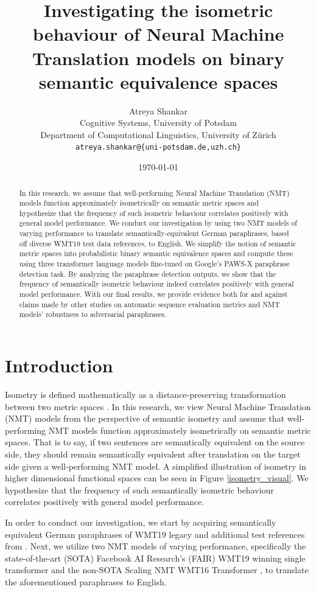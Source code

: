 \documentclass[11pt,a4paper]{article}
\title{Investigating the isometric behaviour of Neural Machine Translation models on binary semantic equivalence spaces}
\author{Atreya Shankar \\
  Cognitive Systems, University of Potsdam \\
  Department of Computational Linguistics, University of Zürich \\
  \texttt{atreya.shankar@\{uni-potsdam.de,uzh.ch\}}}
\date{\today}
\begin{document}
\maketitle

\begin{abstract}
In this research, we assume that well-performing Neural Machine Translation (NMT) models function approximately isometrically on semantic metric spaces and hypothesize that the frequency of such isometric behaviour correlates positively with general model performance. We conduct our investigation by using two NMT models of varying performance to translate semantically-equivalent German paraphrases, based off diverse WMT19 test data references, to English. We simplify the notion of semantic metric spaces into probabilistic binary semantic equivalence spaces and compute these using three transformer language models fine-tuned on Google's PAWS-X paraphrase detection task. By analyzing the paraphrase detection outputs, we show that the frequency of semantically isometric behaviour indeed correlates positively with general model performance. With our final results, we provide evidence both for and against claims made by other studies on automatic sequence evaluation metrics and NMT models' robustness to adversarial paraphrases.
\end{abstract}

\section{Introduction}

Isometry is defined mathematically as a distance-preserving transformation between two metric spaces \cite{coxeter1961introduction}. In this research, we view Neural Machine Translation (NMT) models from the perspective of semantic isometry and assume that well-performing NMT models function approximately isometrically on semantic metric spaces. That is to say, if two sentences are semantically equivalent on the source side, they should remain semantically equivalent after translation on the target side given a well-performing NMT model. A simplified illustration of isometry in higher dimensional functional spaces can be seen in Figure \ref{isometry_visual}. We hypothesize that the frequency of such semantically isometric behaviour correlates positively with general model performance. 

In order to conduct our investigation, we start by acquiring semantically equivalent German paraphrases of WMT19 legacy and additional test references from \citet{freitag-bleu-paraphrase-references-2020}. Next, we utilize two NMT models of varying performance, specifically the state-of-the-art (SOTA) Facebook AI Research's (FAIR) WMT19 winning single transformer \cite{ng2019facebook} and the non-SOTA Scaling NMT WMT16 Transformer \cite{ott2018scaling}, to translate the aforementioned paraphrases to English.
\end{document}
